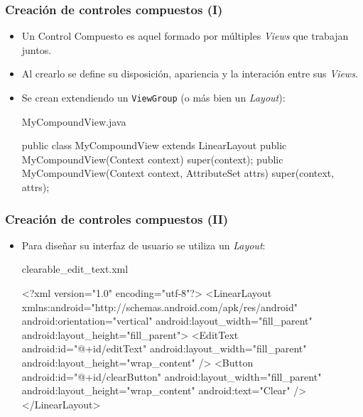 \documentclass[hyperref={pdfpagelabels=true},ucs]{beamer}
\begin{document}
\begin{frame}[fragile]
\frametitle{Creación de controles compuestos (I)}

\begin{itemize}
\item Un \alert{Control Compuesto} es aquel formado por múltiples
  \emph{Views} que trabajan juntos.
\item Al crearlo se define su disposición, apariencia y la interación
  entre sus \emph{Views}.
\item Se crean extendiendo un \verb|ViewGroup| (o más bien un
  \emph{Layout}):

\begin{tiny}
\begin{block}{MyCompoundView.java}
\begin{java}
public class MyCompoundView extends LinearLayout {
  public MyCompoundView(Context context) {
    super(context);
  }
  public MyCompoundView(Context context, AttributeSet attrs) {
    super(context, attrs);
  }
}
\end{java}
\end{block}
\end{tiny}


\end{itemize}

\end{frame}


\begin{frame}[fragile]
\frametitle{Creación de controles compuestos (II)}

\begin{itemize}
\item Para diseñar su interfaz de usuario se utiliza un \emph{Layout}:
\begin{tiny}
\begin{block}{clearable\_edit\_text.xml}
\begin{xml}
<?xml version="1.0" encoding="utf-8"?>
<LinearLayout xmlns:android="http://schemas.android.com/apk/res/android"
  android:orientation="vertical"
  android:layout_width="fill_parent"
  android:layout_height="fill_parent">
  <EditText
     android:id="@+id/editText"
     android:layout_width="fill_parent"
     android:layout_height="wrap_content"
  />
  <Button
     android:id="@+id/clearButton"
     android:layout_width="fill_parent"
     android:layout_height="wrap_content"
     android:text="Clear"
  />
</LinearLayout>
\end{xml}
\end{block}
\end{tiny}

\end{itemize}

\end{frame}
\end{document}
